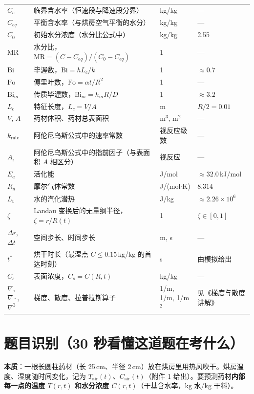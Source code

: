 \documentclass[12pt,a4paper]{ctexart}
\begin{document}
\begin{center}
\begin{tabular}{llll}
$C_c$ & 临界含水率（恒速段与降速段分界） & kg/kg & --- \\
$C_{eq}$ & 平衡含水率（与烘房空气平衡的水分） & kg/kg & --- \\
$C_0$ & 初始水分浓度（水分比公式中） & kg/kg & 2.55 \\
$\mathrm{MR}$ & 水分比，$\mathrm{MR}=(C-C_{eq})/(C_0-C_{eq})$ & 1 & --- \\
$\mathrm{Bi}$ & 毕渥数，$\mathrm{Bi}=hL_c/k$ & 1 & $\approx0.7$ \\
$\mathrm{Fo}$ & 傅里叶数，$\mathrm{Fo}=\alpha t/R^2$ & 1 & --- \\
$\mathrm{Bi}_m$ & 传质毕渥数，$\mathrm{Bi}_m=h_mR/D$ & 1 & $\approx3.2$ \\
$L_c$ & 特征长度，$L_c=V/A$ & m & $R/2=0.01$ \\
$V$, $A$ & 药材体积、药材总表面积 & m$^3$, m$^2$ & --- \\
$k_{\mathrm{rate}}$ & 阿伦尼乌斯公式中的速率常数 & 视反应级数 & --- \\
$A_{\mathrm{r}}$ & 阿伦尼乌斯公式中的指前因子（与表面积 $A$ 相区分） & 视反应 & --- \\
$E_a$ & 活化能 & J/mol & $\approx32.0$\,kJ/mol \\
$R_g$ & 摩尔气体常数 & J/(mol$\cdot$K) & $8.314$ \\
$L_v$ & 水的汽化潜热 & J/kg & $\approx2.26\times10^6$ \\
$\zeta$ & Landau 变换后的无量纲半径，$\zeta=r/R(t)$ & 1 & $\zeta\in[0,1]$ \\
$\Delta r$, $\Delta t$ & 空间步长、时间步长 & m, s & --- \\
$t^*$ & 烘干时长（最湿点 $C\le0.15$\,kg/kg 的首达时刻） & s & 由模拟给出 \\
$C_s$ & 表面浓度，$C_s=C(R,t)$ & kg/kg & --- \\
$\nabla$, $\nabla\cdot$, $\nabla^2$ & 梯度、散度、拉普拉斯算子 & 1/m, 1/m, 1/m$^2$ & 见《梯度与散度讲解》 \\
\bottomrule
\end{tabular}
\end{center}

\section{题目识别（30 秒看懂这道题在考什么）}

\textbf{本质}：一根长圆柱药材（长 25\,cm、半径 2\,cm）放在烘房里用热风吹干。烘房温度、湿度随时间变化，记为 $T_{\mathrm{air}}(t)$、$C_{\mathrm{air}}(t)$（附件 1 给出）。要预测药材\textbf{内部每一点的温度 $T(r,t)$ 和水分浓度 $C(r,t)$}（干基含水率，kg 水/kg 干料）。
\end{document}
